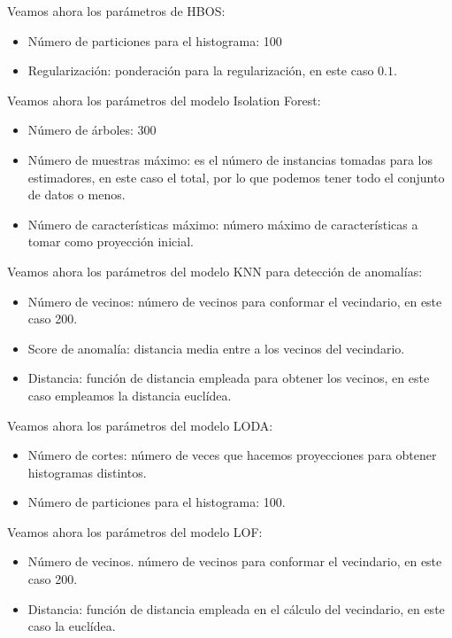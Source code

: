 Veamos ahora los parámetros de HBOS:
\begin{itemize}
	\item Número de particiones para el histograma: 100
	\item Regularización: ponderación para la regularización, en este caso $0.1$.
\end{itemize}

Veamos ahora los parámetros del modelo Isolation Forest:
\begin{itemize}
	\item Número de árboles: 300
	\item Número de muestras máximo: es el número de instancias tomadas para los estimadores, en este caso el total, por lo que podemos tener todo el conjunto de datos o menos.
	\item Número de características máximo: número máximo de características a tomar como proyección inicial.
\end{itemize}

Veamos ahora los parámetros del modelo KNN para detección de anomalías:
\begin{itemize}
	\item Número de vecinos: número de vecinos para conformar el vecindario, en este caso 200.
	\item Score de anomalía: distancia media entre a los vecinos del vecindario.
	\item Distancia: función de distancia empleada para obtener los vecinos, en este caso empleamos la distancia euclídea.
\end{itemize}

Veamos ahora los parámetros del modelo LODA:
\begin{itemize}
	\item Número de cortes: número de veces que hacemos proyecciones para obtener histogramas distintos.
	\item Número de particiones para el histograma: 100.
\end{itemize}

Veamos ahora los parámetros del modelo LOF:
\begin{itemize}
	\item Número de vecinos. número de vecinos para conformar el vecindario, en este caso 200.
	\item Distancia: función de distancia empleada en el cálculo del vecindario, en este caso la euclídea.
\end{itemize}

